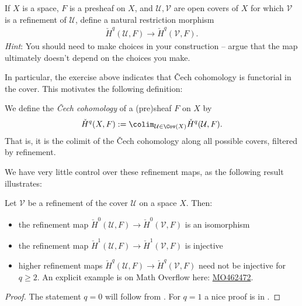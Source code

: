 \documentclass[11pt]{amsart}
\begin{document}
\begin{exercise} If $X$ is a space, $F$ is a presheaf on $X$, and $\mathcal{U},\mathcal{V}$ are open covers of $X$ for which $\mathcal{V}$ is a refinement of $\mathcal{U}$, define a natural restriction morphism
\begin{align*}
    \check{H}^q(\mathcal{U},F) \to \check{H}^q(\mathcal{V},F).
\end{align*}
\textit{Hint}: You should need to make choices in your construction -- argue that the map ultimately doesn't depend on the choices you make.
\end{exercise}

In particular, the exercise above indicates that \v{C}ech cohomology is functorial in the cover. This motivates the following definition:

\begin{definition}\label{def:Cech-cohomology} 
We define the \emph{\v{C}ech cohomology} of a (pre)sheaf $F$ on $X$ by
\begin{align*}
    \check{H}^q(X,F) := \colim_{\mathcal{U}\in \Cov(X)} \check{H}^q(\mathcal{U},F).
\end{align*}
That is, it is the colimit of the \v{C}ech cohomology along all possible covers, filtered by refinement.
\end{definition}

We have very little control over these refinement maps, as the following result illustrates:

\begin{proposition}\label{prop:injectivity-of-refinement-of-Cech-cohomology} Let $\mathcal{V}$ be a refinement of the cover $\mathcal{U}$ on a space $X$. Then:
\begin{itemize}
    \item the refinement map $\check{H}^0(\mathcal{U},F) \to \check{H}^0(\mathcal{V},F)$ is an isomorphism
    \item the refinement map $\check{H}^1(\mathcal{U},F) \to \check{H}^1(\mathcal{V},F)$ is injective
    \item higher refinement maps $\check{H}^q(\mathcal{U},F) \to \check{H}^q(\mathcal{V},F)$ need not be injective for $q\ge 2$. An explicit example is on Math Overflow here: \href{https://mathoverflow.net/a/462472}{MO462472}.
\end{itemize}
\end{proposition}
\begin{proof} The statement $q=0$ will follow from . For $q=1$ a nice proof is in \cite[12.4]{Forster}.
\end{proof}
\end{document}
